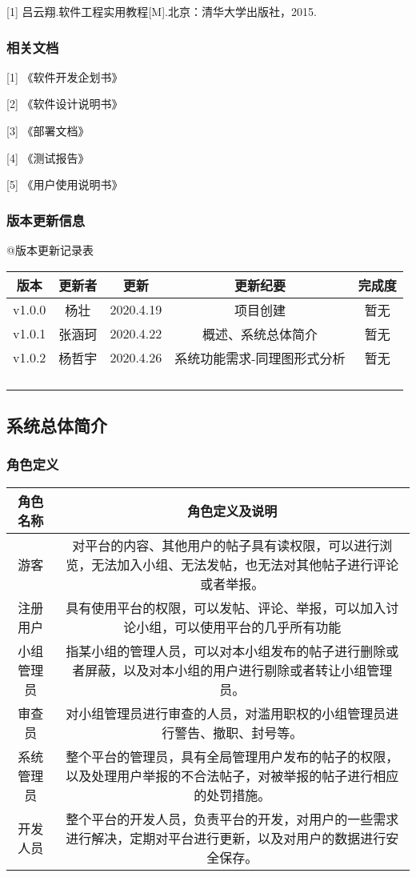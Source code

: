 \documentclass[
]{article}
\begin{document}
{[}1{]} 吕云翔.软件工程实用教程{[}M{]}.北京：清华大学出版社，2015.

\hypertarget{header-n13}{%
\subsubsection{相关文档}\label{header-n13}}

{[}1{]} 《软件开发企划书》

{[}2{]} 《软件设计说明书》

{[}3{]} 《部署文档》

{[}4{]} 《测试报告》

{[}5{]} 《用户使用说明书》

\hypertarget{header-n19}{%
\subsubsection{版本更新信息}\label{header-n19}}

@版本更新记录表

\begin{longtable}[]{@{}ccccc@{}}
\toprule
版本 & 更新者 & 更新 & 更新纪要 & 完成度\tabularnewline
\midrule
\endhead
v1.0.0 & 杨壮 & 2020.4.19 & 项目创建 & 暂无\tabularnewline
v1.0.1 & 张涵珂 & 2020.4.22 & 概述、系统总体简介 & 暂无\tabularnewline
v1.0.2 & 杨哲宇 & 2020.4.26 & 系统功能需求-同理图形式分析 &
暂无\tabularnewline
& & & &\tabularnewline
& & & &\tabularnewline
& & & &\tabularnewline
& & & &\tabularnewline
\bottomrule
\end{longtable}

\hypertarget{header-n70}{%
\subsection{系统总体简介}\label{header-n70}}

\hypertarget{header-n71}{%
\subsubsection{角色定义}\label{header-n71}}

\begin{longtable}[]{@{}cc@{}}
\toprule
角色名称 & 角色定义及说明\tabularnewline
\midrule
\endhead
游客 &
对平台的内容、其他用户的帖子具有读权限，可以进行浏览，无法加入小组、无法发帖，也无法对其他帖子进行评论或者举报。\tabularnewline
注册用户 &
具有使用平台的权限，可以发帖、评论、举报，可以加入讨论小组，可以使用平台的几乎所有功能\tabularnewline
小组管理员 &
指某小组的管理人员，可以对本小组发布的帖子进行删除或者屏蔽，以及对本小组的用户进行剔除或者转让小组管理员。\tabularnewline
审查员 &
对小组管理员进行审查的人员，对滥用职权的小组管理员进行警告、撤职、封号等。\tabularnewline
系统管理员 &
整个平台的管理员，具有全局管理用户发布的帖子的权限，以及处理用户举报的不合法帖子，对被举报的帖子进行相应的处罚措施。\tabularnewline
开发人员 &
整个平台的开发人员，负责平台的开发，对用户的一些需求进行解决，定期对平台进行更新，以及对用户的数据进行安全保存。\tabularnewline
\bottomrule
\end{longtable}
\end{document}
